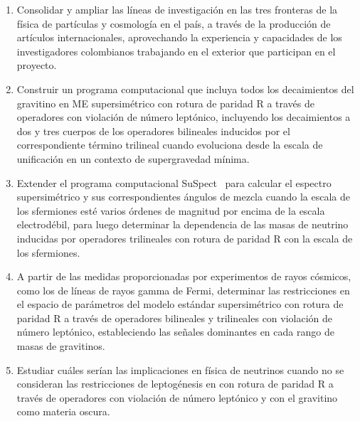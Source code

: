 \begin{enumerate}
\item Consolidar y ampliar las líneas de investigación en las tres
  fronteras de la física de partículas y cosmología en el país, a
  través de la producción de artículos internacionales, aprovechando la
  experiencia y capacidades de los investigadores colombianos
  trabajando en el exterior que participan en el proyecto.

\item \begin{gravitinodm}
  Construir un programa computacional que incluya todos los
  decaimientos del gravitino en ME supersimétrico con
  rotura de paridad R a través de operadores con violación de número
  leptónico, incluyendo los decaimientos a dos y tres cuerpos de los
  operadores bilineales inducidos por el correspondiente término
  trilineal cuando evoluciona desde la escala de unificación en un
  contexto de supergravedad mínima.
\end{gravitinodm}
\label{item:gravitinodm1}

\item 
\begin{gravitinodm}
  Extender el programa computacional
  SuSpect~\cite{Djouadi:2002ze} para calcular el espectro supersimétrico y sus
  correspondientes ángulos de mezcla cuando la escala de los
  sfermiones esté varios órdenes de magnitud por encima de la escala
  electrodébil, para luego determinar la dependencia de las masas
  de neutrino inducidas por operadores trilineales con rotura de
  paridad R con la escala de los sfermiones.
\end{gravitinodm}
\label{item:gravitinodm2}
\item 
\begin{gravitinodm}
  A partir de las medidas proporcionadas por experimentos de rayos cósmicos, como los
  de líneas de rayos gamma de Fermi, determinar las restricciones
  en el espacio de parámetros del modelo estándar supersimétrico con
  rotura de paridad R a través de operadores bilineales y trilineales
  con violación de número leptónico, estableciendo las señales
  dominantes en cada rango de masas de gravitinos.
\end{gravitinodm}

\item
\begin{gravitinodm}
  Estudiar cuáles serían las implicaciones en física de neutrinos
  cuando no se consideran las restricciones de leptogénesis en con
  rotura de paridad R a través de operadores con violación de número
  leptónico y con el gravitino como materia oscura.
\end{gravitinodm}


\end{enumerate}
